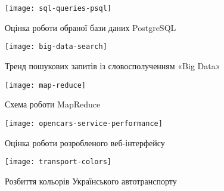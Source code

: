 \chapter{}

\begin{figure}[h]
\centering
\texttt{[image: sql-queries-psql]}
\caption{Оцінка роботи обраної бази даних PostgreSQL}
\label{fig:sql-queries-psql}
\end{figure}

\begin{figure}[h]
\centering
\texttt{[image: big-data-search]}
\caption{Тренд пошукових запитів із словосполученням «Big Data»}
\label{fig:big-data-search}
\end{figure}

\begin{figure}[h]
\centering
\texttt{[image: map-reduce]}
\caption{Схема роботи MapReduce}
\label{fig:map-reduce}
\end{figure}

\begin{figure}[h]
\centering
\texttt{[image: opencars-service-performance]}
\caption{Оцінка роботи розробленого веб-інтерфейсу}
\label{fig:opencars-service-performance}
\end{figure}

\begin{figure}[h]
\centering
\texttt{[image: transport-colors]}
\caption{Розбиття кольорів Українського автотранспорту}
\label{fig:transport-colors}
\end{figure}
